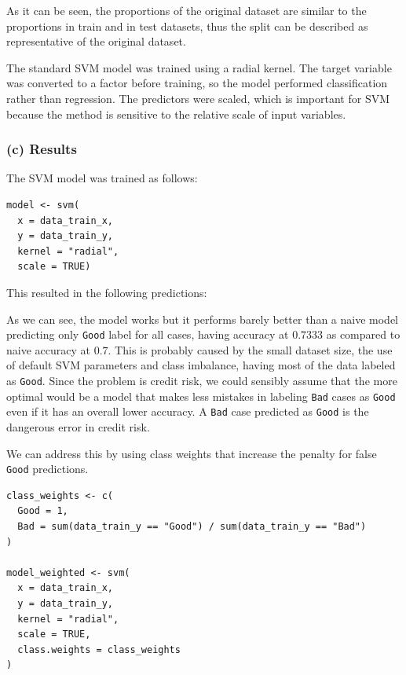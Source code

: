 \documentclass{article}
\begin{document}


As it can be seen, the proportions of the original dataset are similar to the proportions in train and in test datasets, thus the split can be described as representative of the original dataset.

The standard SVM model was trained using a radial kernel. The target variable was converted to a factor before training, so the model performed classification rather than regression. The predictors were scaled, which is important for SVM because the method is sensitive to the relative scale of input variables.

\subsubsection*{(c) Results}

The SVM model was trained as follows:

\begin{verbatim}
model <- svm(
  x = data_train_x,
  y = data_train_y,
  kernel = "radial",
  scale = TRUE)
\end{verbatim}

This resulted in the following predictions:



As we can see, the model works but it performs barely better than a naive model predicting only \texttt{Good} label for all cases, having accuracy at $0.7333$ as compared to naive accuracy at $0.7$. This is probably caused by the small dataset size, the use of default SVM parameters and class imbalance, having most of the data labeled as \texttt{Good}. Since the problem is credit risk, we could sensibly assume that the more optimal would be a model that makes less mistakes in labeling \texttt{Bad} cases as \texttt{Good} even if it has an overall lower accuracy. A \texttt{Bad} case predicted as \texttt{Good} is the dangerous error in credit risk.

We can address this by using class weights that increase the penalty for false \texttt{Good} predictions.

\begin{verbatim}
class_weights <- c(
  Good = 1,
  Bad = sum(data_train_y == "Good") / sum(data_train_y == "Bad")
)

model_weighted <- svm(
  x = data_train_x,
  y = data_train_y,
  kernel = "radial",
  scale = TRUE,
  class.weights = class_weights
)
\end{verbatim}
\end{document}
